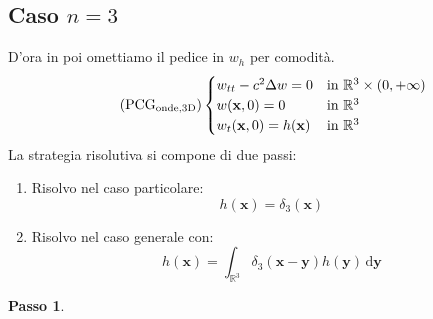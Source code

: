 \documentclass[10pt,a4paper,twoside,openright]{book}
\newcommand{\x}{\mathbf{x}}
\newcommand{\y}{\mathbf{y}}
\newcommand{\de}{\,\mathrm d}
\newcommand{\dyy}{\de \y}
\begin{document}
\subsection{Caso \texorpdfstring{$n=3$}{n=3}}

D'ora in poi omettiamo il pedice in $\displaystyle w_{h}$ per comodità.
\begin{equation*}
	\tag{PCG$_{\text{onde,3D}}$}
	\begin{cases}
		w_{tt} -c^{2} \Delta w=0            & \text{in} \ \mathbb{R}^{3} \times (0,+\infty) \\
		w(\x ,0) =0                 & \text{in} \ \mathbb{R}^{3}                      \\
		w_{t}(\x ,0) =h(\x) & \text{in} \ \mathbb{R}^{3}                      
	\end{cases}
	\label{eq:pcg-onde-3d}
\end{equation*}
La strategia risolutiva si compone di due passi:
\begin{enumerate}
	\item Risolvo nel caso particolare:
		\begin{equation*}
			h(\x) =\delta _{3}(\x)
		\end{equation*}
	\item Risolvo nel caso generale con:
		\begin{equation*}
			h(\x) =\int _{\mathbb{R}^{3}} \delta _{3}(\x -\y) h(\y) \dyy
		\end{equation*}
\end{enumerate}



\textbf{Passo 1}.
\end{document}
